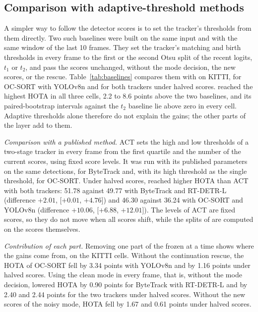 \subsection{Comparison with adaptive-threshold methods}\label{sec:baselines}
A simpler way to follow the detector scores is to set the tracker's
thresholds from them directly. Two such baselines were built on the same
input and with the same window of the last 10 frames. They set the tracker's
matching and birth thresholds in every frame to the first or the second Otsu
split of the recent logits, $t_1$ or $t_2$, and pass the scores unchanged,
without the mode decision, the new scores, or the rescue.
Table~\ref{tab:baselines} compares them with \scl{} on KITTI, for OC-SORT
with YOLOv8n and for both trackers under halved scores. \scl{} reached the
highest HOTA in all three cells, 2.2 to 8.6 points above the two baselines,
and its paired-bootstrap intervals against the $t_2$ baseline lie
above zero in every cell. Adaptive thresholds alone therefore do not explain
the gains; the other parts of the layer add to them.

\emph{Comparison with a published method.} ACT \cite{act2026adaptive} sets the
high and low thresholds of a two-stage tracker in every frame from the first
quartile and the number of the current scores, using fixed score levels. It
was run with its published parameters on the same detections, for ByteTrack
and, with its high threshold as the single threshold, for OC-SORT. Under
halved scores, \scl{} reached higher HOTA than ACT with both trackers: 51.78
against 49.77 with ByteTrack and RT-DETR-L (difference $+2.01$,
[$+0.01$, $+4.76$]) and 46.30 against 36.24 with OC-SORT and YOLOv8n
(difference $+10.06$, [$+6.88$, $+12.01$]). The levels of ACT are fixed
scores, so they do not move when all scores shift, while the splits of
\scl{} are computed on the scores themselves.

\emph{Contribution of each part.} Removing one part of the frozen \scl{} at
a time shows where the gains come from, on the KITTI cells. Without the
continuation rescue, the HOTA of OC-SORT fell by 3.34 points with YOLOv8n and
by 1.16 points under halved scores. Using the clean mode in every frame,
that is, without the mode decision, lowered HOTA by 0.90 points
for ByteTrack with RT-DETR-L and by 2.40 and 2.44 points for the two trackers
under halved scores. Without the new scores of the noisy mode, HOTA fell by
1.67 and 0.61 points under halved scores.



